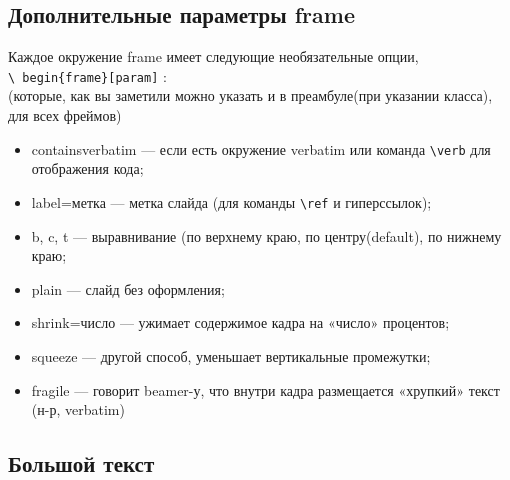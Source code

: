 \documentclass[aspectratio=169,
]{beamer}
\begin{document}
\subsection{Дополнительные параметры frame}
\begin{frame}[containsverbatim, fragile, label=f17]
Каждое окружение frame имеет следующие необязательные опции, \\
\verb|\ begin{frame}[param]| : \\
(которые, как вы заметили можно указать и в преамбуле(при указании класса), для всех фреймов)
\begin{itemize}
\item containsverbatim — если есть окружение verbatim или команда \verb|\verb| для отображения кода;
\item label=метка — метка слайда (для команды \verb|\ref| и гиперссылок);
\item b, c, t — выравнивание (по верхнему краю, по центру(default), по нижнему краю;
\item plain — слайд без оформления;
\item shrink=число — ужимает содержимое кадра на «число» процентов;
\item squeeze — другой способ, уменьшает вертикальные промежутки;
\item fragile — говорит beamer-у, что внутри кадра размещается «хрупкий» текст (н-р, verbatim)
\end{itemize}
\end{frame}
\frametitle{\insertsection}
\framesubtitle{\insertsubsection}


\subsection{Большой текст}
\end{document}
